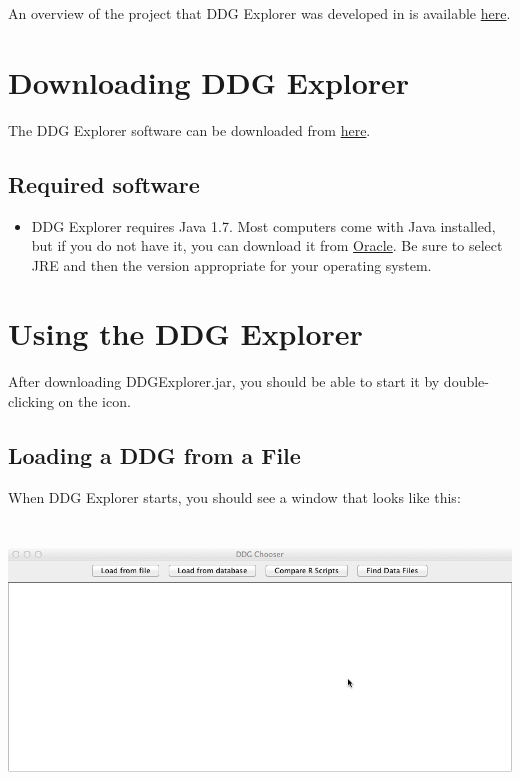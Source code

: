 \documentclass[12pt]{article}
\newcommand\liststyleWWviiiNumii{%
\renewcommand\labelitemi{•}
\renewcommand\labelitemii{•}
\renewcommand\labelitemiii{•}
\renewcommand\labelitemiv{•}
}
\begin{document}
{\mdseries\upshape\color{black}
An overview of the project that DDG Explorer was developed in is available \href{http://www.mtholyoke.edu/~blerner/DataProvenance/}{here}.

\section{Downloading DDG Explorer}
{\mdseries\upshape\color{black}
The DDG Explorer software can be downloaded from \href{http://www.mtholyoke.edu/\~blerner/DataProvenance/code/ddg-explorer.jar}{here}.}

\subsection{Required software}

\liststyleWWviiiNumii
\begin{itemize}
\item {\color{black}
DDG Explorer requires Java 1.7. Most computers come with Java installed, but if you do not have it, you can download it from \href{http://www.oracle.com/technetwork/java/javase/downloads/index.html}{Oracle}. Be sure to select JRE and then the version appropriate for your operating system.}
\end{itemize}

\section{Using the DDG Explorer}
{\mdseries\upshape\color{black}
After downloading DDGExplorer.jar, you should be able to start it by double-clicking on the icon.}

\subsection{Loading a DDG from a File}
{\mdseries\upshape\color{black}
When DDG Explorer starts, you should see a window that looks like this:}

\includegraphics[width=6.5in,height=2.889in]{UsingDDGExplorer-img/UsingDDGExplorer-img001.png} 

}
\end{document}
